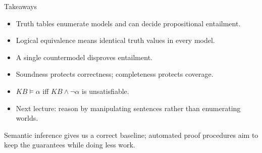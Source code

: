 \documentclass[aspectratio=169,10pt]{beamer}
\begin{document}
\begin{frame}[shrink=12]{Takeaways}
  \begin{itemize}
    \item Truth tables enumerate models and can decide propositional entailment.
    \item Logical equivalence means identical truth values in every model.
    \item A single countermodel disproves entailment.
    \item Soundness protects correctness; completeness protects coverage.
    \item $KB\models\alpha$ iff $KB\land\neg\alpha$ is unsatisfiable.
    \item Next lecture: reason by manipulating sentences rather than enumerating worlds.
  \end{itemize}

  \begin{keyidea}
    Semantic inference gives us a correct baseline; automated proof procedures aim to keep the guarantees while doing less work.
  \end{keyidea}
\end{frame}
\end{document}
